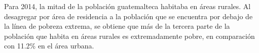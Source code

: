 Para 2014, la mitad de la población guatemalteca habitaba en áreas rurales. Al desagregar por área de residencia a la población que se encuentra por debajo de la línea de pobreza extrema, se obtiene que más de la tercera parte de la población que habita en áreas rurales es extremadamente pobre, en comparación con 11.2\% en el área urbana.